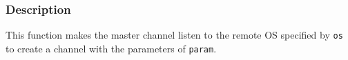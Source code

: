 \documentclass[twoside,11pt,fleqn]{book}
\begin{document}
\subsubsection*{Description}{\quad}
This function makes the master channel listen to the remote OS specified by \texttt{os} to create a channel with the parameters of \texttt{param}. 
\end{document}
